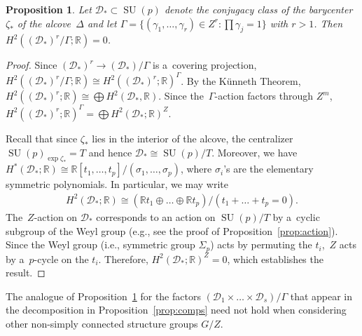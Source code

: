 \documentclass[pdftex]{sigma}
\numberwithin{equation}{section}
\newtheorem{Proposition}[Theorem]{Proposition}
{\theoremstyle{definition}
\newtheorem{Definition}[Theorem]{Definition}
\newtheorem{Example}[Theorem]{Example}
\newtheorem{Remark}[Theorem]{Remark}
}
\DeclareMathOperator{\SU}{SU}
\begin{document}
\begin{Proposition}
\label{prop:nofreeH2}
Let $\mathcal{D}_* \subset \SU(p)$ denote the conjugacy class of the barycenter $\zeta_* $ of the alcove~$\Delta$ and
let $\Gamma = \{(\gamma_1, \ldots, \gamma_r) \in Z^r \colon \prod \gamma_j =1 \}$ with $r>1$.
Then $H^2((\mathcal{D}_*)^r/\Gamma;{\mathbb{R}})=0$.
\end{Proposition}
\begin{proof}
Since $(\mathcal{D}_*)^r \to (\mathcal{D}_*)/\Gamma$ is a~covering projection,
$H^2((\mathcal{D}_*)^r/\Gamma;{\mathbb{R}}) \cong H^2 ((\mathcal{D}_*)^r; {\mathbb{R}})^\Gamma$.
By the K\"unneth Theorem, $H^2((\mathcal{D}_*)^r;{\mathbb{R}}) \cong \bigoplus H^2(\mathcal{D}_*,{\mathbb{R}})$.
Since the~$\Gamma$-action factors through $Z^m$, $H^2 ((\mathcal{D}_*)^r; {\mathbb{R}})^\Gamma = \bigoplus
H^2(\mathcal{D}_*;{\mathbb{R}})^Z$.

Recall that since $\zeta_*$ lies in the interior of the alcove, the centralizer $\SU(p)_{\exp \zeta_*} = T$ and hence
$\mathcal{D}_* \cong \SU(p)/T$.
Moreover, we have $H^*(\mathcal{D}_*;{\mathbb{R}})\cong {\mathbb{R}}[t_1, \ldots, t_p]/(\sigma_1, \ldots, \sigma_p)$,
where $\sigma_i$'s are the elementary symmetric polynomials.
In particular, we may write
\begin{gather*}
H^2(\mathcal{D}_*;{\mathbb{R}}) \cong ({\mathbb{R}} t_1 \oplus \dots \oplus {\mathbb{R}} t_p)/(t_1+ \dots + t_p=0).
\end{gather*}
The~$Z$-action on $\mathcal{D}_*$ corresponds to an action on $\SU(p)/T$ by a~cyclic subgroup of the Weyl group (e.g.,
see the proof of Proposition~\ref{prop:action}).
Since the Weyl group (i.e., symmetric group $\Sigma_p$) acts by permuting the $t_i$,~$Z$ acts by a~$p$-cycle on the $t_i$.
Therefore, $H^2(\mathcal{D}_*;{\mathbb{R}})^Z=0$, which establishes the result.
\end{proof}

\begin{Remark}
\label{remark:lament}
The analogue of Proposition~\ref{prop:nofreeH2} for the factors $(\mathcal{D}_1 \times \dots \times
\mathcal{D}_s)/\Gamma$ that appear in the decomposition in Proposition~\ref{prop:comps} need not hold when considering
other non-simply connected structure groups $G/Z$.
\end{Remark}
\end{document}
